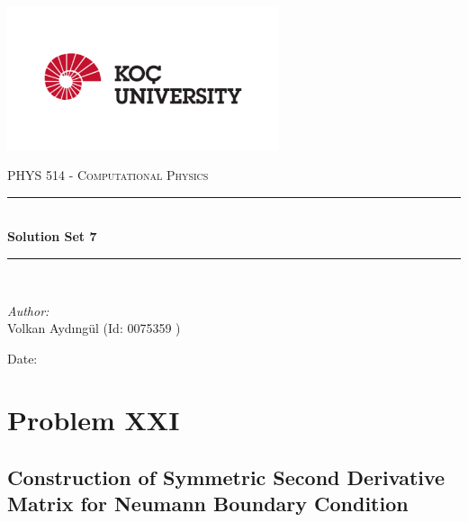 \documentclass[letterpaper,12pt]{article}
\newcommand{\reporttitle}{Solution Set 7}
\newcommand{\reportauthor}{ Volkan Aydıngül (Id: 0075359 )\\
                            }
\begin{document}
\begin{titlepage}
\newcommand{\HRule}{\rule{0.7\linewidth}{0.5mm}}
\begin{center} %
\includegraphics[width = 8cm]{figures/koc_logo.png}

\textsc{\Large PHYS 514 - Computational Physics}\\[1.5cm] 
\HRule \\[0.6cm]
{ \huge \bfseries \reporttitle}\\ %
\HRule \\[1.5cm]
\end{center}
\vspace{2cm}
\begin{flushleft} \large
\textit{Author:}\\
\reportauthor%
\end{flushleft}
\vspace{2cm}
\makeatletter
Date: \@date 
\vfill %
\makeatother
\end{titlepage}




\tableofcontents
\newpage







\section{Problem XXI}
\subsection{Construction of Symmetric Second Derivative Matrix for Neumann Boundary Condition}
\end{document}
